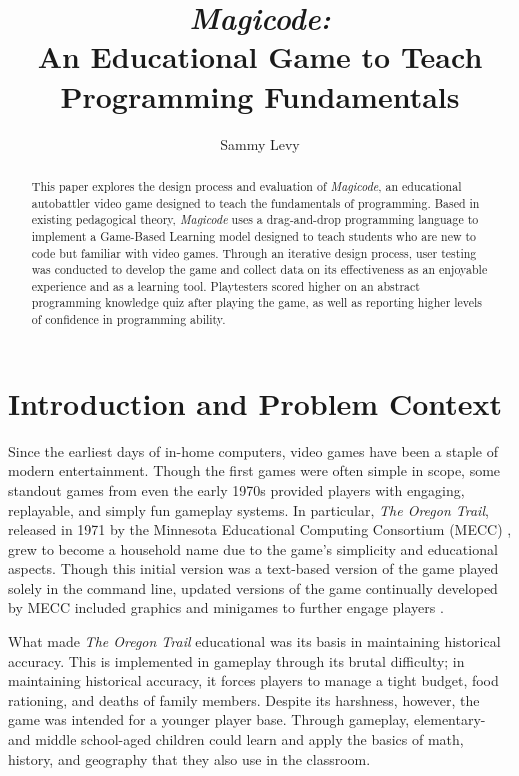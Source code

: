 \documentclass[10pt,twocolumn]{article}
\title{\textit{Magicode:} \\ An Educational Game to Teach Programming Fundamentals}
\author{Sammy Levy}
\affiliation{Occidental College}
\begin{document}
\maketitle

\begin{abstract}
    This paper explores the design process and evaluation of \textit{Magicode}, an educational autobattler video game designed to teach the fundamentals of programming. Based in existing pedagogical theory, \textit{Magicode} uses a drag-and-drop programming language to implement a Game-Based Learning model designed to teach students who are new to code but familiar with video games. Through an iterative design process, user testing was conducted to develop the game and collect data on its effectiveness as an enjoyable experience and as a learning tool. Playtesters scored higher on an abstract programming knowledge quiz after playing the game, as well as reporting higher levels of confidence in programming ability.
\end{abstract}

\section{Introduction and Problem Context}
Since the earliest days of in-home computers, video games have been a staple of modern entertainment. Though the first games were often simple in scope, some standout games from even the early 1970s provided players with engaging, replayable, and simply fun gameplay systems. In particular, \textit{The Oregon Trail}, released in 1971 by the Minnesota Educational Computing Consortium (MECC) \cite{oregon-trail-video}, grew to become a household name due to the game’s simplicity and educational aspects. Though this initial version was a text-based version of the game played solely in the command line, updated versions of the game continually developed by MECC included graphics and minigames to further engage players \cite{oregon-trail-archived}.

What made \textit{The Oregon Trail} educational was its basis in maintaining historical accuracy. This is implemented in gameplay through its brutal difficulty; in maintaining historical accuracy, it forces players to manage a tight budget, food rationing, and deaths of family members. Despite its harshness, however, the game was intended for a younger player base. Through gameplay, elementary- and middle school-aged children could learn and apply the basics of math, history, and geography that they also use in the classroom.
\end{document}
